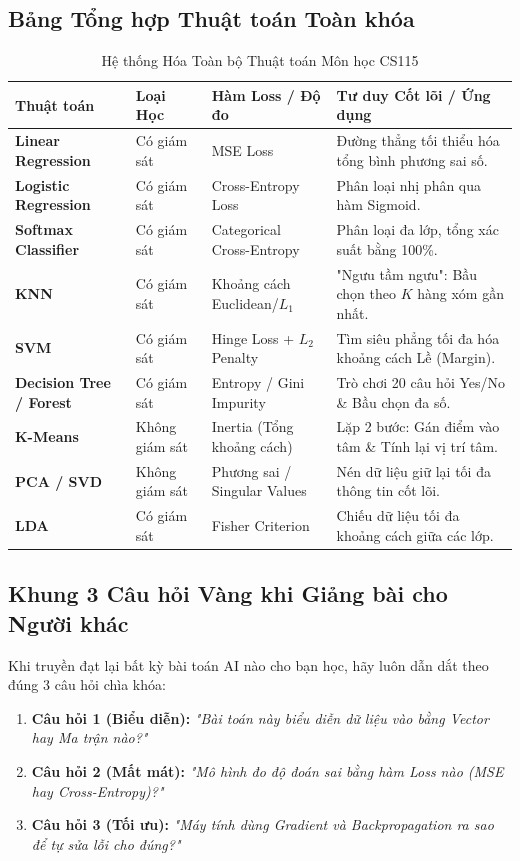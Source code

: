 \documentclass[11pt,a4paper]{article}
\begin{document}
\subsection{Bảng Tổng hợp Thuật toán Toàn khóa}
\begin{table}[h]
\centering
\caption{Hệ thống Hóa Toàn bộ Thuật toán Môn học CS115}
\begin{tabular}{p{3.5cm}p{2.5cm}p{3.5cm}p{5.5cm}}
\toprule
\textbf{Thuật toán} & \textbf{Loại Học} & \textbf{Hàm Loss / Độ đo} & \textbf{Tư duy Cốt lõi / Ứng dụng} \\
\midrule
\textbf{Linear Regression} & Có giám sát & MSE Loss & Đường thẳng tối thiểu hóa tổng bình phương sai số. \\
\textbf{Logistic Regression} & Có giám sát & Cross-Entropy Loss & Phân loại nhị phân qua hàm Sigmoid. \\
\textbf{Softmax Classifier} & Có giám sát & Categorical Cross-Entropy & Phân loại đa lớp, tổng xác suất bằng 100\%. \\
\textbf{KNN} & Có giám sát & Khoảng cách Euclidean/$L_1$ & "Ngưu tầm ngưu": Bầu chọn theo $K$ hàng xóm gần nhất. \\
\textbf{SVM} & Có giám sát & Hinge Loss + $L_2$ Penalty & Tìm siêu phẳng tối đa hóa khoảng cách Lề (Margin). \\
\textbf{Decision Tree / Forest} & Có giám sát & Entropy / Gini Impurity & Trò chơi 20 câu hỏi Yes/No \& Bầu chọn đa số. \\
\textbf{K-Means} & Không giám sát & Inertia (Tổng khoảng cách) & Lặp 2 bước: Gán điểm vào tâm \& Tính lại vị trí tâm. \\
\textbf{PCA / SVD} & Không giám sát & Phương sai / Singular Values & Nén dữ liệu giữ lại tối đa thông tin cốt lõi. \\
\textbf{LDA} & Có giám sát & Fisher Criterion & Chiếu dữ liệu tối đa khoảng cách giữa các lớp. \\
\bottomrule
\end{tabular}
\end{table}

\subsection{Khung 3 Câu hỏi Vàng khi Giảng bài cho Người khác}
Khi truyền đạt lại bất kỳ bài toán AI nào cho bạn học, hãy luôn dẫn dắt theo đúng 3 câu hỏi chìa khóa:
\begin{enumerate}
    \item \textbf{Câu hỏi 1 (Biểu diễn):} \textit{"Bài toán này biểu diễn dữ liệu vào bằng Vector hay Ma trận nào?"}
    \item \textbf{Câu hỏi 2 (Mất mát):} \textit{"Mô hình đo độ đoán sai bằng hàm Loss nào (MSE hay Cross-Entropy)?"}
    \item \textbf{Câu hỏi 3 (Tối ưu):} \textit{"Máy tính dùng Gradient và Backpropagation ra sao để tự sửa lỗi cho đúng?"}
\end{enumerate}
\end{document}
